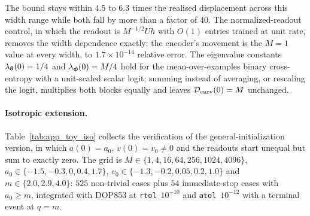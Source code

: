 The bound stays within $4.5$ to $6.3$ times the realised displacement across
this width range while both fall by more than a factor of $40$. The
normalized-readout control, in which the readout is $M^{-1/2}Uh$ with $O(1)$
entries trained at unit rate, removes the width dependence exactly: the
encoder's movement is the $M = 1$ value at every width, to $1.7\times10^{-14}$
relative error. The eigenvalue constants $\lambda_{\boldsymbol{\theta}}(0) = 1/4$ and
$\lambda_{\boldsymbol{\phi}}(0) = M/4$ hold for the mean-over-examples binary cross-entropy
with a unit-scaled scalar logit; summing instead of averaging, or rescaling the
logit, multiplies both blocks equally and leaves $\mathcal{D}_{\mathrm{curv}}(0) = M$ unchanged.

\paragraph{Isotropic extension.} Table~\ref{tab:app_toy_iso} collects the
verification of the general-initialization version, in which $a(0) = a_0$,
$v(0) = v_0 \neq 0$ and the readouts start unequal but sum to exactly zero.
The grid is $M \in \{1, 4, 16, 64, 256, 1024, 4096\}$, $a_0 \in \{-1.5, -0.3,
0, 0.4, 1.7\}$, $v_0 \in \{-1.3, -0.2, 0.05, 0.2, 1.0\}$ and $m \in \{2.0,
2.9, 4.0\}$: $525$ non-trivial cases plus $54$ immediate-stop cases with
$a_0 \geq m$, integrated with DOP853 at \texttt{rtol}~$10^{-10}$ and
\texttt{atol}~$10^{-12}$ with a terminal event at $q = m$.

